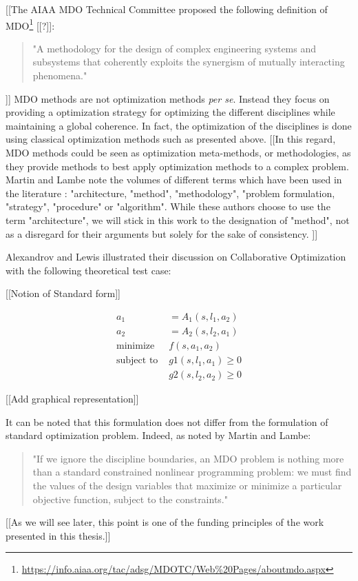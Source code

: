 [[The AIAA MDO Technical Committee proposed the following definition of MDO\footnote{\url{https://info.aiaa.org/tac/adsg/MDOTC/Web\%20Pages/aboutmdo.aspx}} [[\cite{american1991current}?]]:
 \begin{quote}
"A methodology for the design of complex engineering systems and subsystems that coherently exploits the synergism of mutually interacting phenomena."
\end{quote}]]
MDO methods are not optimization methods \emph{per se}. Instead they focus on providing a optimization strategy for optimizing the different disciplines while maintaining a global coherence. In fact, the optimization of the disciplines is done using classical optimization methods such as presented above. [[In this regard, MDO methods could be seen as optimization meta-methods, or methodologies, as they provide methods to best apply optimization methods to a complex problem. Martin and Lambe\cite{Lambe:2011:A} note the volumes of different terms which have been used in the literature :  "architecture, "method", "methodology", "problem formulation, "strategy", "procedure" or "algorithm". While these authors choose to use the term "architecture", we will stick in this work to the designation of "method", not as a disregard for their arguments but solely for the sake of  consistency.  ]] 

Alexandrov and Lewis illustrated their discussion on Collaborative Optimization\cite{NataliaM.:2000:ACA:886733} with the following theoretical test case:

[[Notion of Standard form]]

\begin{align*}
a_1 &= A_1(s, l_1, a_2) \\
a_2 &= A_2(s, l_2, a_1) \\
\text{minimize } &f(s, a_1, a_2) \\
\text{subject to } &g1(s, l_1, a_1) \geq 0 \\
								&g2(s, l_2, a_2) \geq 0
\end{align*}

[[Add graphical representation]]

It can be noted that this formulation does not differ from the formulation of standard optimization problem. Indeed, as noted by Martin and Lambe\cite{Lambe:2011:A}:
 \begin{quote}
 "If we ignore the discipline boundaries, an MDO problem is nothing more than a standard constrained nonlinear programming problem: we must find the values of the design variables that maximize or minimize a particular objective function, subject to the constraints."
\end{quote}
[[As we will see later, this point is one of the funding principles of the work presented in this thesis.]]

